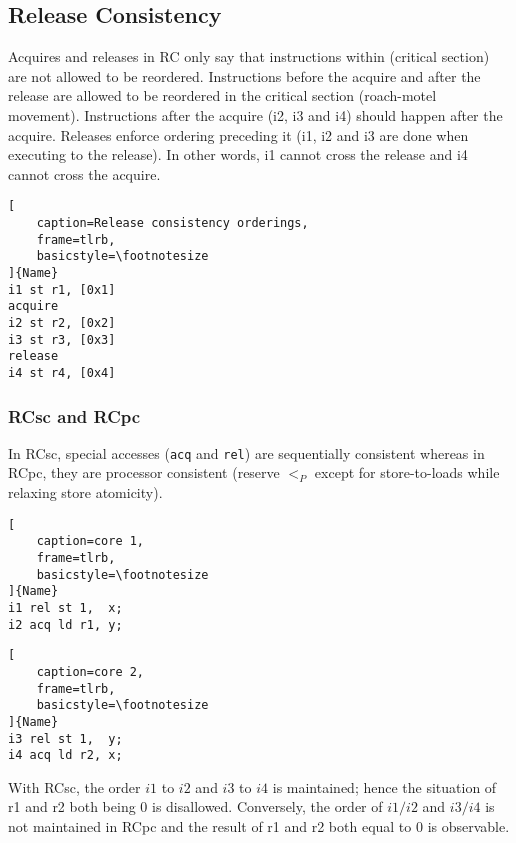 \documentclass{article}
\begin{document}
\begin{multicols*}{2}
\subsection{Release Consistency}
Acquires and releases in RC only say that instructions within (critical section) are not allowed to be reordered. Instructions before the acquire and after the release are allowed to be reordered in the critical section (roach-motel movement). Instructions after the acquire (i2, i3 and i4) should happen after the acquire. Releases enforce ordering preceding it (i1, i2 and i3 are done when executing to the release). In other words, i1 cannot cross the release and i4 cannot cross the acquire.
\begin{lstlisting}[
    caption=Release consistency orderings,
    frame=tlrb,
    basicstyle=\footnotesize
]{Name}
i1 st r1, [0x1]
acquire
i2 st r2, [0x2]
i3 st r3, [0x3]
release
i4 st r4, [0x4]
\end{lstlisting}

\subsubsection{RCsc and RCpc}
In RCsc, special accesses (\texttt{acq} and \texttt{rel}) are sequentially consistent whereas in RCpc, they are processor consistent (reserve $<_P$ except for store-to-loads while relaxing store atomicity).

\noindent\begin{minipage}{.2\textwidth}
\captionsetup{labelformat=empty}
\begin{lstlisting}[
    caption=core 1,
    frame=tlrb, 
    basicstyle=\footnotesize
]{Name}
i1 rel st 1,  x;
i2 acq ld r1, y;
\end{lstlisting}
\end{minipage}\hfill
\begin{minipage}{.2\textwidth}
\captionsetup{labelformat=empty}
\begin{lstlisting}[
    caption=core 2,
    frame=tlrb,
    basicstyle=\footnotesize
]{Name}
i3 rel st 1,  y;
i4 acq ld r2, x;
\end{lstlisting}
\end{minipage}

\noindent\newline
With RCsc, the order $i1$ to $i2$ and $i3$ to $i4$ is maintained; hence the situation of r1 and r2 both being 0 is disallowed. Conversely, the order of $i1/i2$ and $i3/i4$ is not maintained in RCpc and the result of r1 and r2 both equal to 0 is observable.


\end{multicols*}
\end{document}
